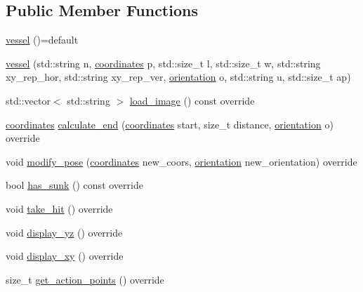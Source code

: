 \subsection*{Public Member Functions}
\begin{DoxyCompactItemize}
\item 
\hyperlink{classbattle__ship_1_1vessel_a6f3be9c2343940c262fb7add97402311}{vessel} ()=default
\item 
\hyperlink{classbattle__ship_1_1vessel_a56fb6c51c60a66f2a85be6081f081388}{vessel} (std\+::string n, \hyperlink{structbattle__ship_1_1coordinates}{coordinates} p, std\+::size\+\_\+t l, std\+::size\+\_\+t w, std\+::string xy\+\_\+rep\+\_\+hor, std\+::string xy\+\_\+rep\+\_\+ver, \hyperlink{namespacebattle__ship_aed87488f0a73f0d0679fe343fb61c784}{orientation} o, std\+::string u, std\+::size\+\_\+t ap)
\item 
std\+::vector$<$ std\+::string $>$ \hyperlink{classbattle__ship_1_1vessel_a36278b899be319a57cb728e8ecd2f340}{load\+\_\+image} () const override
\item 
\hyperlink{structbattle__ship_1_1coordinates}{coordinates} \hyperlink{classbattle__ship_1_1vessel_a9b99c5ed2629203985b25338df585234}{calculate\+\_\+end} (\hyperlink{structbattle__ship_1_1coordinates}{coordinates} start, size\+\_\+t distance, \hyperlink{namespacebattle__ship_aed87488f0a73f0d0679fe343fb61c784}{orientation} o) override
\item 
void \hyperlink{classbattle__ship_1_1vessel_ace0ec527147243b1fa6fa920d5a32a1f}{modify\+\_\+pose} (\hyperlink{structbattle__ship_1_1coordinates}{coordinates} new\+\_\+coors, \hyperlink{namespacebattle__ship_aed87488f0a73f0d0679fe343fb61c784}{orientation} new\+\_\+orientation) override
\item 
bool \hyperlink{classbattle__ship_1_1vessel_a5f36d687fbb87ced436d2d88847a1d5c}{has\+\_\+sunk} () const override
\item 
void \hyperlink{classbattle__ship_1_1vessel_ab0da3c305902d55594b7aa5d20b69509}{take\+\_\+hit} () override
\item 
void \hyperlink{classbattle__ship_1_1vessel_aa4f50939cb109b09c6b300313e193198}{display\+\_\+yz} () override
\item 
void \hyperlink{classbattle__ship_1_1vessel_a60924b058d686ebf545ae8f4d9f42d76}{display\+\_\+xy} () override
\item 
size\+\_\+t \hyperlink{classbattle__ship_1_1vessel_a398b4134137d9e11c13e6aee548e1802}{get\+\_\+action\+\_\+points} () override
\item 

\end{DoxyCompactItemize}
